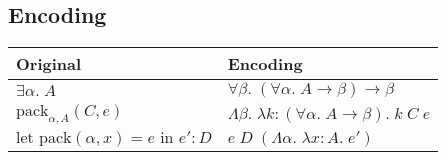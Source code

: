 \documentclass[a4paper,11pt]{article}
\begin{document}
{    \subsection*{Encoding}
    {

        \begin{tabular}{l | l}
        Original & Encoding \\
        \hline
        \(\exists\alpha.\;A\) & \(\forall\beta.\;(\forall\alpha.\;A\rightarrow\beta)\rightarrow\beta\) \\
        \(\text{pack}_{\alpha,A}(C,e)\) & \(\Lambda\beta.\;\lambda k:(\forall\alpha.\;A\rightarrow\beta).\;k\;C\;e\) \\
        \(\text{let pack}(\alpha,x) = e\text{ in }e' : D\) & \(e\;D\;(\Lambda\alpha.\;\lambda x:A.\;e')\) \\
        \end{tabular}
    }
}
\end{document}
